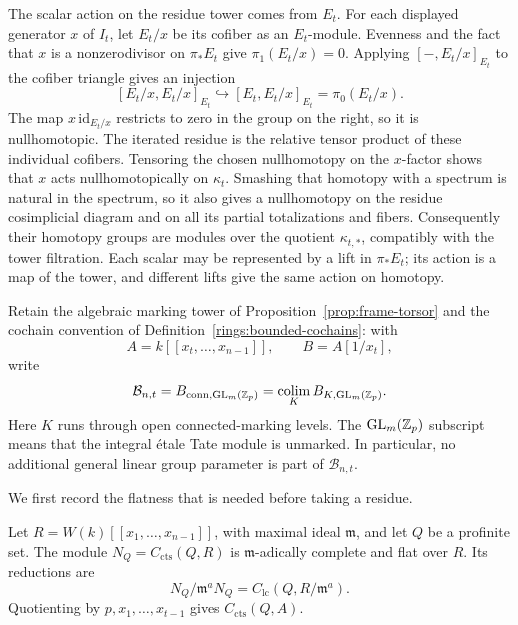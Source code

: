 The scalar action on the residue tower comes from \(E_t\).
For each displayed generator \(x\) of \(I_t\), let \(E_t/x\) be its
cofiber as an \(E_t\)-module. Evenness and the fact that \(x\) is a
nonzerodivisor on \(\pi_*E_t\) give \(\pi_1(E_t/x)=0\).
Applying \([-,E_t/x]_{E_t}\) to the cofiber triangle gives an injection
\[
[E_t/x,E_t/x]_{E_t}\hookrightarrow
[E_t,E_t/x]_{E_t}=\pi_0(E_t/x).
\]
The map \(x\,\mathrm{id}_{E_t/x}\) restricts to zero in the group on
the right, so it is nullhomotopic. The iterated residue is the relative
tensor product of these individual cofibers. Tensoring the chosen
nullhomotopy on the \(x\)-factor shows that \(x\) acts nullhomotopically
on \(\kappa_t\). Smashing that homotopy with a spectrum is natural in
the spectrum, so it also gives a nullhomotopy on the residue
cosimplicial diagram and on all its partial totalizations and fibers.
Consequently their homotopy groups are modules over the quotient
\(\kappa_{t,*}\), compatibly with the tower filtration. Each scalar
may be represented by a lift in \(\pi_*E_t\); its action is a map of
the tower, and different lifts give the same action on homotopy.

Retain the algebraic marking tower of
Proposition~\ref{prop:frame-torsor} and the cochain convention of
Definition~\ref{rings:bounded-cochains}: with
\[
A=k[[x_t,\ldots,x_{n-1}]],\qquad B=A[1/x_t],
\]
write
\begin{equation}
\mathcal B_{n,t}
 =B_{\mathrm{conn},\operatorname{GL}_m(\mathbb Z_p)}
 =\operatorname*{colim}_K B_{K,\operatorname{GL}_m(\mathbb Z_p)}.
\label{spec:connected-coefficients}
\end{equation}
Here \(K\) runs through open connected-marking levels. The
\(\operatorname{GL}_m(\mathbb Z_p)\) subscript means that the integral \'etale
Tate module is unmarked. In particular, no additional general linear
group parameter is part of \(\mathcal B_{n,t}\).

We first record the flatness that is needed before taking a residue.

\begin{lemma}
\label{spec:flat-functions}
Let \(R=W(k)[[x_1,\ldots,x_{n-1}]]\), with maximal ideal
\(\mathfrak m\), and let \(Q\) be a profinite set. The module
\(N_Q=C_{\mathrm{cts}}(Q,R)\) is \(\mathfrak m\)-adically
complete and flat over \(R\). Its reductions are
\[
N_Q/\mathfrak m^aN_Q
 =C_{\mathrm{lc}}(Q,R/\mathfrak m^a).
\]
Quotienting by \(p,x_1,\ldots,x_{t-1}\) gives
\(C_{\mathrm{cts}}(Q,A)\).
\end{lemma}

